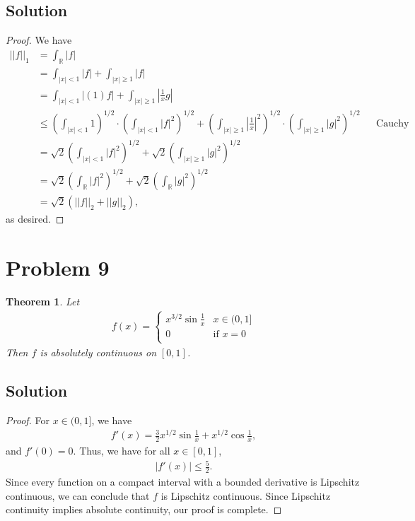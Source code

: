 \documentclass[10pt,a4paper]{article}
\theoremstyle{theorem}
\newtheorem{theorem}{Theorem}
\theoremstyle{definition}
\begin{document}
\subsection*{Solution}
\begin{proof}
We have
\begin{align*}
||f||_1 &= \int_\mathbb{R} |f|\\
&= \int_{|x| < 1} |f| + \int_{|x| \geq 1} |f|\\
&= \int_{|x| < 1} |(1)f| + \int_{|x| \geq 1} \left|\frac{1}{x}g \right|\\
&\leq \left( \int_{|x| < 1} 1 \right)^{1/2} \cdot \left( \int_{|x| < 1} |f|^2 \right)^{1/2} + \left( \int_{|x| \geq 1} \left| \frac{1}{x} \right|^2 \right)^{1/2} \cdot \left( \int_{|x| \geq 1} |g|^2 \right)^{1/2} &&\text{Cauchy Schwarz's}\\
&= \sqrt{2} \left( \int_{|x| < 1} |f|^2 \right)^{1/2} + \sqrt{2} \left( \int_{|x| \geq 1} |g|^2 \right)^{1/2}\\
&= \sqrt{2} \left( \int_{\mathbb{R}} |f|^2 \right)^{1/2} + \sqrt{2} \left( \int_{\mathbb{R}} |g|^2 \right)^{1/2}\\
&= \sqrt{2}(||f||_2 + ||g||_2),
\end{align*}
as desired.
\end{proof}

\section*{Problem 9}
\begin{theorem}
Let 
\begin{align*}
f(x) = \begin{cases} 
      x^{3/2} \sin\frac{1}{x} & x \in (0, 1] \\
     0 & \text{if } x=0 \\
\end{cases}
\end{align*}
Then $f$ is absolutely continuous on $[0, 1]$.
\end{theorem}

\subsection*{Solution}
\begin{proof}
For $x \in (0, 1]$, we have
\begin{align*}
f'(x) = \frac{3}{2}x^{1/2} \sin \frac{1}{x} + x^{1/2} \cos \frac{1}{x},
\end{align*}
and $f'(0) = 0$. Thus, we have for all $x \in [0, 1]$, 
\begin{align*}
|f'(x)| \leq \frac{5}{2}.
\end{align*}
Since every function on a compact interval with a bounded derivative is Lipschitz continuous, we can conclude that $f$ is Lipschitz continuous. Since Lipschitz continuity implies absolute continuity, our proof is complete.
\end{proof}
\end{document}
